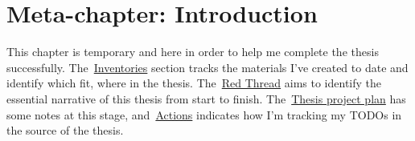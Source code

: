 \section{Meta-chapter: Introduction}
This chapter is temporary and here in order to help me complete the thesis successfully. The~\href{section_inventories}{Inventories} section tracks the materials I've created to date and identify which fit, where in the thesis. The~\href{section_read_thread}{Red Thread} aims to identify the essential narrative of this thesis from start to finish. The~\href{section_thesis_project_plan}{Thesis project plan} has some notes at this stage, and~\href{meta-chapter-actions}{Actions} indicates how I'm tracking my TODOs in the source of the thesis.
